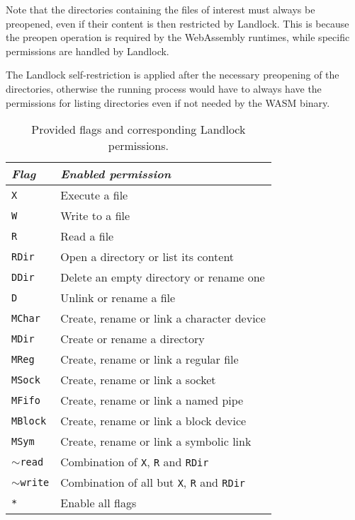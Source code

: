 Note that the directories containing the files of interest must always be preopened,
even if their content is then restricted by Landlock. This is because the preopen operation
is required by the WebAssembly runtimes, while specific permissions are handled by Landlock.

The Landlock self-restriction is applied after the necessary preopening of the directories,
otherwise the running process would have to always have the permissions for listing directories even if
not needed by the WASM binary.

\begin{table}[hbt]
  \centering
  \begin{tabular}{|l|l|}
    \hline
    \textit{Flag} & \textit{Enabled permission} \\ \hline\hline
    \texttt{X} & Execute a file \\ \hline
    \texttt{W} & Write to a file \\ \hline
    \texttt{R} & Read a file \\ \hline
    \texttt{RDir} & Open a directory or list its content \\ \hline
    \texttt{DDir} & Delete an empty directory or rename one \\ \hline
    \texttt{D} & Unlink or rename a file \\ \hline
    \texttt{MChar} & Create, rename or link a character device \\ \hline
    \texttt{MDir} & Create or rename a directory \\ \hline
    \texttt{MReg} & Create, rename or link a regular file \\ \hline
    \texttt{MSock} & Create, rename or link a socket \\ \hline
    \texttt{MFifo} & Create, rename or link a named pipe \\ \hline
    \texttt{MBlock} & Create, rename or link a block device \\ \hline
    \texttt{MSym} & Create, rename or link a symbolic link \\ \hline
    \texttt{$\sim$read} & Combination of \texttt{X}, \texttt{R} and \texttt{RDir} \\ \hline
    \texttt{$\sim$write} & Combination of all but \texttt{X}, \texttt{R} and \texttt{RDir} \\ \hline
    \texttt{*} & Enable all flags \\ \hline
  \end{tabular}
  \caption{Provided flags and corresponding Landlock permissions.}
  \label{table:landlock-flags}
\end{table}

